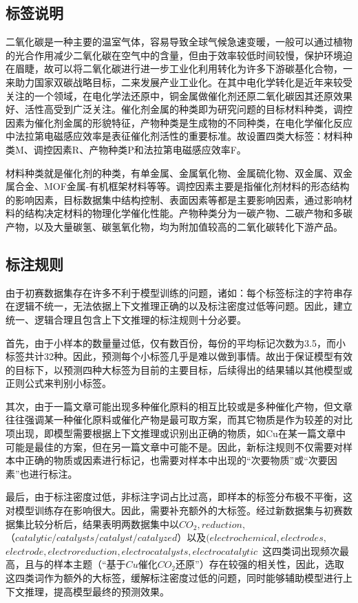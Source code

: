\documentclass{article}
\begin{document}
\subsection{标签说明}
二氧化碳是一种主要的温室气体，容易导致全球气候急速变暖，一般可以通过植物的光合作用减少二氧化碳在空气中的含量，但由于效率较低时间较慢，保护环境迫在眉睫，故可以将二氧化碳进行进一步工业化利用转化为许多下游碳基化合物，一来助力国家双碳战略目标，二来发展产业工业化。在其中电化学转化是近年来较受关注的一个领域，在电化学法还原中，铜金属做催化剂还原二氧化碳因其还原效果好、活性高受到广泛关注。催化剂金属的种类即为研究问题的目标材料种类，调控因素为催化剂金属的形貌特征，产物种类是生成物的不同种类，在电化学催化反应中法拉第电磁感应效率是表征催化剂活性的重要标准。故设置四类大标签：材料种类M、调控因素R、产物种类P和法拉第电磁感应效率F。

材料种类就是催化剂的种类，有单金属、金属氧化物、金属硫化物、双金属、双金属合金、MOF金属-有机框架材料等等。调控因素主要是指催化剂材料的形态结构的影响因素，目标数据集中结构控制、表面因素等都是主要影响因素，通过影响材料的结构决定材料的物理化学催化性能。产物种类分为一碳产物、二碳产物和多碳产物，以及大量碳氢、碳氢氧化物，均为附加值较高的二氧化碳转化下游产品。
\subsection{标注规则}
由于初赛数据集存在许多不利于模型训练的问题，诸如：每个标签标注的字符串存在逻辑不统一，无法依据上下文推理正确的以及标注密度过低等问题。因此，建立统一、逻辑合理且包含上下文推理的标注规则十分必要。

首先，由于小样本的数量量过低，仅有数百份，每份的平均标记次数为3.5，而小标签共计32种。因此，预测每个小标签几乎是难以做到事情。故出于保证模型有效的目标下，以预测四种大标签为目前的主要目标，后续得出的结果辅以其他模型或正则公式来判别小标签。

其次，由于一篇文章可能出现多种催化原料的相互比较或是多种催化产物，但文章往往强调某一种催化原料或催化产物是最可取方案，而其它物质是作为较差的对比项出现，即模型需要根据上下文推理或识别出正确的物质，如Cu在某一篇文章中可能是最佳的方案，但在另一篇文章中可能不是。因此，新标注规则不仅需要对样本中正确的物质或因素进行标记，也需要对样本中出现的“次要物质”或“次要因素”也进行标注。

最后，由于标注密度过低，非标注字词占比过高，即样本的标签分布极不平衡，这对模型训练存在影响很大。因此，需要补充额外的大标签。经过新数据集与初赛数据集比较分析后，结果表明两数据集中以$CO_2 ,reduction ,$ $（catalytic/catalysts/catalyst/catalyzed）$以及$(electrochemical, electrodes,$ $electrode, electroreduction, electrocatalysts, electrocatalytic$ 这四类词出现频次最高，且与的样本主题（“基于$Cu$催化$CO_2$​还原”）存在较强的相关性，因此，选取这四类词作为额外的大标签，缓解标注密度过低的问题，同时能够辅助模型进行上下文推理，提高模型最终的预测效果。
\end{document}
